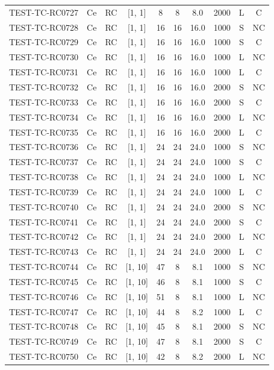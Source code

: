 \begin{longtable}{lccccccccc}
TEST-TC-RC0727 & Ce & RC & [1, 1] & 8 & 8 & 8.0 & 2000 & L & C \\
TEST-TC-RC0728 & Ce & RC & [1, 1] & 16 & 16 & 16.0 & 1000 & S & NC \\
TEST-TC-RC0729 & Ce & RC & [1, 1] & 16 & 16 & 16.0 & 1000 & S & C \\
TEST-TC-RC0730 & Ce & RC & [1, 1] & 16 & 16 & 16.0 & 1000 & L & NC \\
TEST-TC-RC0731 & Ce & RC & [1, 1] & 16 & 16 & 16.0 & 1000 & L & C \\
TEST-TC-RC0732 & Ce & RC & [1, 1] & 16 & 16 & 16.0 & 2000 & S & NC \\
TEST-TC-RC0733 & Ce & RC & [1, 1] & 16 & 16 & 16.0 & 2000 & S & C \\
TEST-TC-RC0734 & Ce & RC & [1, 1] & 16 & 16 & 16.0 & 2000 & L & NC \\
TEST-TC-RC0735 & Ce & RC & [1, 1] & 16 & 16 & 16.0 & 2000 & L & C \\
TEST-TC-RC0736 & Ce & RC & [1, 1] & 24 & 24 & 24.0 & 1000 & S & NC \\
TEST-TC-RC0737 & Ce & RC & [1, 1] & 24 & 24 & 24.0 & 1000 & S & C \\
TEST-TC-RC0738 & Ce & RC & [1, 1] & 24 & 24 & 24.0 & 1000 & L & NC \\
TEST-TC-RC0739 & Ce & RC & [1, 1] & 24 & 24 & 24.0 & 1000 & L & C \\
TEST-TC-RC0740 & Ce & RC & [1, 1] & 24 & 24 & 24.0 & 2000 & S & NC \\
TEST-TC-RC0741 & Ce & RC & [1, 1] & 24 & 24 & 24.0 & 2000 & S & C \\
TEST-TC-RC0742 & Ce & RC & [1, 1] & 24 & 24 & 24.0 & 2000 & L & NC \\
TEST-TC-RC0743 & Ce & RC & [1, 1] & 24 & 24 & 24.0 & 2000 & L & C \\
TEST-TC-RC0744 & Ce & RC & [1, 10] & 47 & 8 & 8.1 & 1000 & S & NC \\
TEST-TC-RC0745 & Ce & RC & [1, 10] & 46 & 8 & 8.1 & 1000 & S & C \\
TEST-TC-RC0746 & Ce & RC & [1, 10] & 51 & 8 & 8.1 & 1000 & L & NC \\
TEST-TC-RC0747 & Ce & RC & [1, 10] & 44 & 8 & 8.2 & 1000 & L & C \\
TEST-TC-RC0748 & Ce & RC & [1, 10] & 45 & 8 & 8.1 & 2000 & S & NC \\
TEST-TC-RC0749 & Ce & RC & [1, 10] & 47 & 8 & 8.1 & 2000 & S & C \\
TEST-TC-RC0750 & Ce & RC & [1, 10] & 42 & 8 & 8.2 & 2000 & L & NC \\

\end{longtable}
